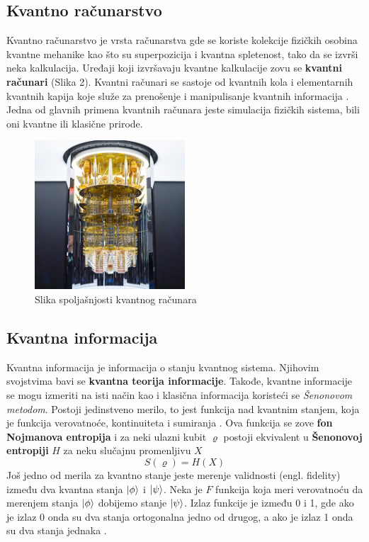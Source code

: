 \documentclass[12pt, letterpaper, oneside]{article}
\begin{document}
\subsection{Kvantno računarstvo}
Kvantno računarstvo je vrsta računarstva gde se koriste kolekcije fizičkih osobina kvantne mehanike kao što su superpozicija i kvantna spletenost,
tako da se izvrši neka kalkulacija. Uređaji koji izvršavaju kvantne kalkulacije zovu se \textbf{kvantni računari} (Slika 2).
Kvantni računari se sastoje od kvantnih kola i elementarnih kvantnih kapija koje služe za prenošenje i manipulisanje kvantnih informacija \cite{nielsen_chuang_10th}. \\
Jedna od glavnih primena kvantnih računara jeste simulacija fizičkih sistema, bili oni kvantne ili klasične prirode.
\begin{figure}[ht]
    \centering
    \includegraphics[width=0.5\textwidth]{files/media_sizes_full_QC-stack-fig-2.jpg}
    \caption{Slika spoljašnjosti kvantnog računara \cite{QuantumComputerImage}}
\end{figure}

\subsection{Kvantna informacija}
Kvantna informacija je informacija o stanju kvantnog sistema. Njihovim svojstvima bavi se \textbf{kvantna teorija informacije}.
Takođe, kvantne informacije se mogu izmeriti na isti način kao i klasična informacija koristeći se \textit{Šenonovom metodom}. 
Postoji jedinstveno merilo, to jest funkcija nad kvantnim stanjem, koja je funkcija verovatnoće, kontinuiteta i sumiranja \cite{vlatko_v}.
Ova funkcija se zove \textbf{fon Nojmanova entropija} i za neki ulazni kubit $\varrho$ postoji ekvivalent u \textbf{Šenonovoj entropiji} $H$
za neku slučajnu promenljivu $X$
\[
    S(\varrho) = H(X)
\]
Još jedno od merila za kvantno stanje jeste merenje validnosti (engl. fidelity) između dva kvantna stanja $\ket{\phi}$ i $\ket{\psi}$.
Neka je $F$ funkcija koja meri verovatnoću da merenjem stanja $\ket{\phi}$ dobijemo stanje $\ket{\psi}$.
Izlaz funkcije je između 0 i 1, gde ako je izlaz 0 onda su dva stanja ortogonalna jedno od drugog, a ako je izlaz 1 onda su dva stanja jednaka \cite{vlatko_v}.
\end{document}
